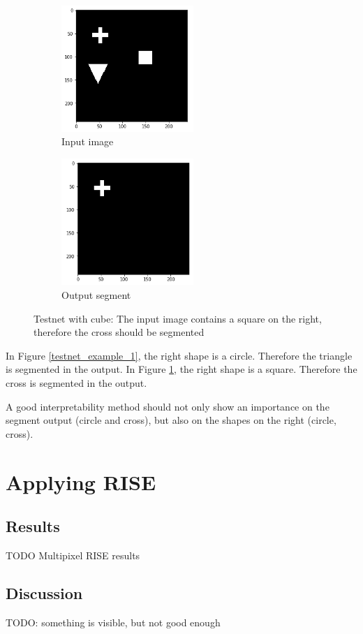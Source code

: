\begin{figure}[H]
    \centering
    \begin{subfigure}{.5\textwidth}
        \centering
        \includegraphics[width=5cm]{chapters/05_testnet/images/testnet_b-0.png}
        \caption{Input image}
    \end{subfigure}%
    \begin{subfigure}{.5\textwidth}
        \centering
        \includegraphics[width=5cm]{chapters/05_testnet/images/testnet_b-1.png}
        \caption{Output segment}
    \end{subfigure}
    \caption{Testnet with cube: The input image contains a square on the right, therefore the cross should be segmented}
    \label{testnet_example_2}
\end{figure}

In Figure \ref{testnet_example_1}, the right shape is a circle. Therefore the triangle is segmented in the output.
In Figure \ref{testnet_example_2}, the right shape is a square. Therefore the cross is segmented in the output.

A good interpretability method should not only show an importance on the segment output (circle and cross), but also on the shapes on the right (circle, cross).

\section{Applying RISE}



\subsection{Results}
TODO Multipixel RISE results

\subsection{Discussion}
TODO: something is visible, but not good enough
